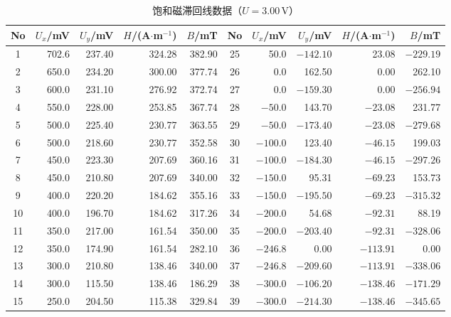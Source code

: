 \documentclass{Phyport}
\begin{document}
\begin{table}[H]
    \centering
    \caption{饱和磁滞回线数据（$U=3.00$\,V）}
    \label{tab:loop}
    \footnotesize
    \setlength{\tabcolsep}{4pt}
    \begin{tabular}{c r r r r c r r r r}
        \toprule
        No & $U_x$/mV & $U_y$/mV & $H$/(A$\cdot$m$^{-1}$) & $B$/mT &
        No & $U_x$/mV & $U_y$/mV & $H$/(A$\cdot$m$^{-1}$) & $B$/mT \\
        \midrule
        1  & 702.6  & 237.40  & 324.28  & 382.90  & 25 & 50.0   & $-142.10$ & 23.08   & $-229.19$ \\
        2  & 650.0  & 234.20  & 300.00  & 377.74  & 26 & 0.0    & 162.50    & 0.00    & 262.10   \\
        3  & 600.0  & 231.10  & 276.92  & 372.74  & 27 & 0.0    & $-159.30$ & 0.00    & $-256.94$ \\
        4  & 550.0  & 228.00  & 253.85  & 367.74  & 28 & $-50.0$ & 143.70   & $-23.08$ & 231.77  \\
        5  & 500.0  & 225.40  & 230.77  & 363.55  & 29 & $-50.0$ & $-173.40$ & $-23.08$ & $-279.68$ \\
        6  & 500.0  & 218.60  & 230.77  & 352.58  & 30 & $-100.0$ & 123.40  & $-46.15$ & 199.03  \\
        7  & 450.0  & 223.30  & 207.69  & 360.16  & 31 & $-100.0$ & $-184.30$ & $-46.15$ & $-297.26$ \\
        8  & 450.0  & 210.80  & 207.69  & 340.00  & 32 & $-150.0$ & 95.31   & $-69.23$ & 153.73  \\
        9  & 400.0  & 220.20  & 184.62  & 355.16  & 33 & $-150.0$ & $-195.50$ & $-69.23$ & $-315.32$ \\
        10 & 400.0  & 196.70  & 184.62  & 317.26  & 34 & $-200.0$ & 54.68   & $-92.31$ & 88.19   \\
        11 & 350.0  & 217.00  & 161.54  & 350.00  & 35 & $-200.0$ & $-203.40$ & $-92.31$ & $-328.06$ \\
        12 & 350.0  & 174.90  & 161.54  & 282.10  & 36 & $-246.8$ & 0.00    & $-113.91$ & 0.00  \\
        13 & 300.0  & 210.80  & 138.46  & 340.00  & 37 & $-246.8$ & $-209.60$ & $-113.91$ & $-338.06$ \\
        14 & 300.0  & 115.50  & 138.46  & 186.29  & 38 & $-300.0$ & $-106.20$ & $-138.46$ & $-171.29$ \\
        15 & 250.0  & 204.50  & 115.38  & 329.84  & 39 & $-300.0$ & $-214.30$ & $-138.46$ & $-345.65$ \\

\end{tabular}
\end{table}
\end{document}
